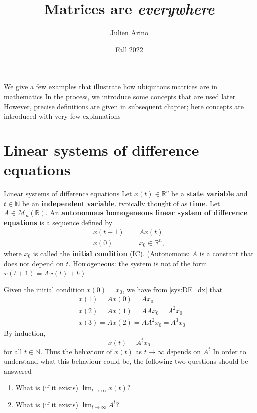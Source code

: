 \documentclass{beamer}
\title{Matrices are \emph{everywhere}}
\author{Julien Arino}
\date{Fall 2022}
\def\IN{\mathbb{N}}
\def\IR{\mathbb{R}}
\def\defword#1{\textbf{#1}}
\begin{document}
\begin{frame}[plain]
    \maketitle
\end{frame}

\begin{frame}
We give a few examples that illustrate how ubiquitous matrices are in mathematics
\vfill
In the process, we introduce some concepts that are used later
\vfill
However, precise definitions are given in subsequent chapter; here concepts are introduced with very few explanations
\end{frame}



\section{Linear systems of difference equations}
\label{sec:linear_DE}
\begin{frame}{Linear systems of difference equations}
Let $x(t)\in \IR^n$ be a \defword{state variable} and $t\in \IN$ be an \defword{independent variable}, typically thought of as \defword{time}. Let $A\in \mathcal{M}_n(\IR)$. 
An \defword{autonomous homogeneous linear system of difference equations} is a sequence defined by
\begin{subequations}\label{sys:DE}
\begin{align}
x(t+1) &= Ax(t) \label{sys:DE_dx}\\
x(0) &=x_0\in \IR^n, \label{sys:DE_IC}
\end{align}	
\end{subequations}
where $x_0$ is called the \defword{initial condition} (IC).
\vfill
(Autonomous: $A$ is a constant that does not depend on $t$. Homogeneous: the system is not of the form $x(t+1)=Ax(t)+b$.)
\end{frame}

\begin{frame}
Given the initial condition $x(0)=x_0$, we have from \eqref{sys:DE_dx} that
\begin{align*}
 &x(1)= Ax(0)=Ax_0\\
 & x(2)= Ax(1)= AAx_0=A^2x_0 \\
 &x(3)=Ax(2)=AA^2x_0=A^3x_0
\end{align*}
\vfill
By induction,
\[
x(t)=A^tx_0
\] 
for all $t\in\IN$.
Thus the behaviour of $x(t)$ as $t\to\infty$ depends on $A^t$
\vfill
In order to understand what this behaviour could be, the following two questions should be answered
\begin{enumerate}
	\item What is (if it exists) $\lim_{t\to \infty} x(t)$? 
	\item What is (if it exists) $\lim_{t \to \infty} A^t$? 
\end{enumerate}
\end{frame}
\end{document}
